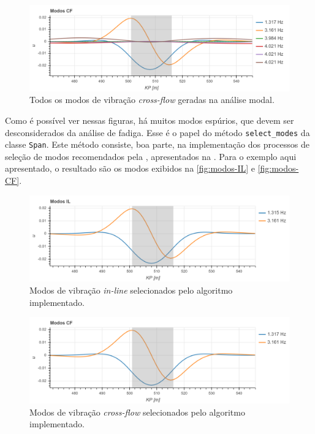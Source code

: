 \begin{figure}[H]
	\centering
	\caption{Todos os modos de vibração \textit{cross-flow} geradas na análise modal.}\label{fig:all-modos-CF}
	\includegraphics[width=\textwidth]{imagens/exemplo/all_modos_CF}
\end{figure}

Como é possível ver nessas figuras, há muitos modos espúrios, que devem ser desconsiderados da análise de fadiga. Esse é o papel do método \texttt{select\_modes} da classe \texttt{Span}. Este método consiste, boa parte, na implementação dos processos de seleção de modos recomendados pela , apresentados na
. Para o exemplo aqui apresentado, o resultado são os modos exibidos na \autoref{fig:modos-IL} e \autoref{fig:modos-CF}.

\begin{figure}[!ht]
	\centering
	\caption{Modos de vibração \textit{in-line} selecionados pelo algoritmo implementado.}\label{fig:modos-IL}
	\includegraphics[width=\textwidth]{imagens/exemplo/modos_IL}
\end{figure}

\begin{figure}[!ht]
	\centering
	\caption{Modos de vibração \textit{cross-flow} selecionados pelo algoritmo implementado.}\label{fig:modos-CF}
	\includegraphics[width=\textwidth]{imagens/exemplo/modos_CF}
\end{figure}

